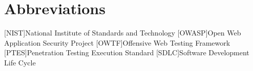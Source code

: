 \documentclass[
11pt,
liststotoc,
bibtotocnumbered,
headheight=34pt     %
]{scrartcl}             %
\newcommand{\centeredpart}[1]{
	\newpage
	\vspace*{\fill}
	\part{#1}
	\vspace*{\fill}
	\newpage
}
\begin{document}
	
	\newpage
	
	\tableofcontents
	\clearpage
	
	\newpage
	
	
	

	
	\newpage
	\section{Abbreviations}
	\begin{acronym}[SMTP] %
		{National Institute of Standards and Technology}		
		[OWASP]{Open Web Application Security Project}
		{Offensive Web Testing Framework}
		{Penetration Testing Execution Standard}		
		{Software Development Life Cycle}		
		
		
	\end{acronym}
	
	
	\newpage
	
	\printbibliography
	
	\appendix
	
		
		
		
\end{document}
